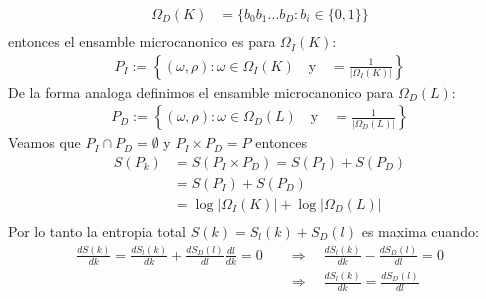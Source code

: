 \begin{answer}
\begin{align*}
        \Omega_D(K) &= \{b_{0}b_{1}\dots b_D: b_i \in \{0,1\}\}\\
    \end{align*}
    entonces el ensamble microcanonico es para $\Omega_I(K)$:
    \begin{align*}
        P_I := \left\{ \left(\omega, \rho \right): \omega \in \Omega_I(K)  \quad \text{y} \quad = \frac{1}{|\Omega_I(K)|}\right\}
    \end{align*}
    De la forma analoga definimos el ensamble microcanonico para $\Omega_D(L)$:
    \begin{align*}
        P_D := \left\{ \left(\omega, \rho \right): \omega \in \Omega_D(L)  \quad \text{y} \quad = \frac{1}{|\Omega_D(L)|}\right\}
    \end{align*}
    Veamos que $P_I \cap P_D = \emptyset$ y $P_I \times P_D = P$ entonces
    \begin{align*}
        S(P_k) &= S(P_I \times P_D) = S(P_I) + S(P_D)\\
        &= S(P_I) + S(P_D)\\
        &= \log |\Omega_I(K)| + \log |\Omega_D(L)|\\
    \end{align*}
    Por lo tanto la entropia total $S(k) = S_l(k) + S_D(l)$ es maxima cuando:
    \begin{align*}
        \frac{d S(k)}{d k} = \frac{d S_l(k)}{d k} + \frac{d S_D(l)} {d l} \frac {d l}{d k} = 0  &\quad \Rightarrow \quad \frac{d S_l(k)}{d k} - \frac{d S_D(l)} {d l} = 0\\
        &\quad \Rightarrow \quad \frac{d S_l(k)}{d k} = \frac{d S_D(l)} {d l}
    \end{align*}
\end{answer}